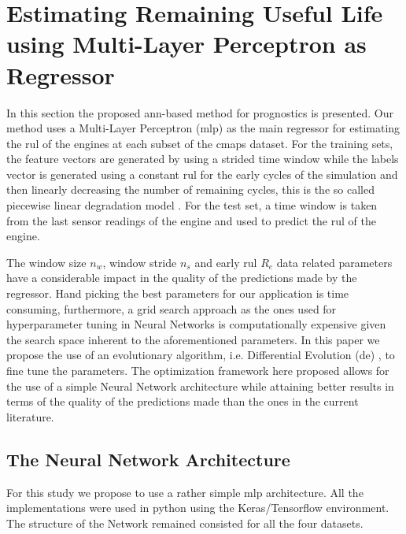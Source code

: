 \section{Estimating Remaining Useful Life using Multi-Layer Perceptron as Regressor}
\label{sec:method}

In this section the proposed \gls{ann}-based method for prognostics is presented. Our method uses a Multi-Layer Perceptron (\gls{mlp}) as the main regressor for estimating the \gls{rul} of the engines at each subset of the \gls{cmaps} dataset. For the training sets, the feature vectors are generated by using a strided time window while the labels vector is generated using a constant \gls{rul} for the early cycles of the simulation and then linearly decreasing the number of remaining cycles, this is the so called piecewise linear degradation model \cite{Ramasso2014}. For the test set, a time window is taken from the last sensor readings of the engine and used to predict the \gls{rul} of the engine.

The window size $n_w$, window stride $n_s$ and early \gls{rul} $R_e$ data related parameters have a considerable impact in the quality of the predictions made by the regressor. Hand picking the best parameters for our application is time consuming, furthermore, a grid search approach as the ones used for hyperparameter tuning in Neural Networks is computationally expensive given the search space inherent to the aforementioned parameters. In this paper we propose the use of an evolutionary algorithm, i.e. Differential Evolution (\gls{de}) \cite{Storn1997}, to fine tune the parameters. The optimization framework here proposed allows for the use of a simple Neural Network architecture while attaining better results in terms of the quality of the predictions made than the ones in the current literature.

\subsection{The Neural Network Architecture}

For this study we propose to use a rather simple \gls{mlp} architecture. All the implementations were used in python using the Keras/Tensorflow environment. The structure of the Network remained consisted for all the four datasets.

